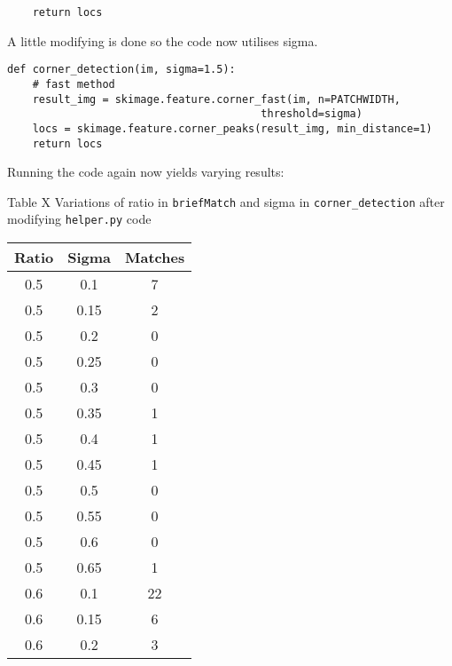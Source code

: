 \documentclass[12pt,letterpaper, onecolumn]{exam}
\begin{document}
\begin{questions}
\begin{solution}
\begin{verbatim}
    return locs
        \end{verbatim}
        A little modifying is done so the code now utilises sigma.
        \begin{verbatim}
def corner_detection(im, sigma=1.5):
	# fast method
	result_img = skimage.feature.corner_fast(im, n=PATCHWIDTH,
                                        threshold=sigma)
	locs = skimage.feature.corner_peaks(result_img, min_distance=1)
	return locs
        \end{verbatim}
        Running the code again now yields varying results: \\
        \begin{center}
            Table X Variations of ratio in \texttt{briefMatch} and sigma in \texttt{corner\_detection} after modifying \texttt{helper.py} code
        \end{center}
        \begin{center}
            \begin{tabular}{|c|c|c|}
                \hline
                \textbf{Ratio} & \textbf{Sigma} & \textbf{Matches} \\
                \hline
                0.5 & 0.1 & 7 \\
                \hline
                0.5 & 0.15 & 2 \\
                \hline
                0.5 & 0.2 & 0 \\
                \hline
                0.5 & 0.25 & 0 \\
                \hline
                0.5 & 0.3 & 0 \\
                \hline
                0.5 & 0.35 & 1 \\
                \hline
                0.5 & 0.4 & 1 \\
                \hline
                0.5 & 0.45 & 1 \\
                \hline
                0.5 & 0.5 & 0 \\
                \hline
                0.5 & 0.55 & 0 \\
                \hline
                0.5 & 0.6 & 0 \\
                \hline
                0.5 & 0.65 & 1 \\
                \hline
                0.6 & 0.1 & 22 \\
                \hline
                0.6 & 0.15 & 6 \\
                \hline
                0.6 & 0.2 & 3 \\

\end{tabular}
\end{center}
\end{solution}
\end{questions}
\end{document}
